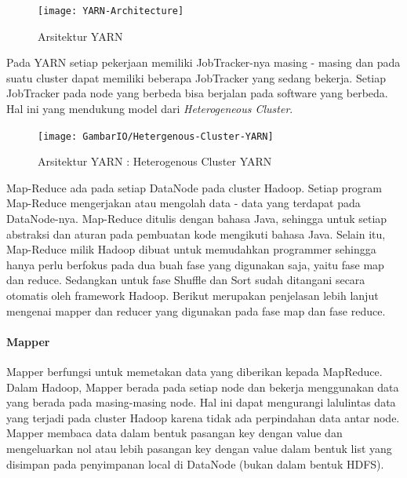 \begin{figure}[H]
\centering
\texttt{[image: YARN-Architecture]}
\caption[Arsitektur YARN]{Arsitektur YARN \footnotemark}
\label{fig:Arsitektur YARN-1}
\end{figure}
		
Pada YARN setiap pekerjaan memiliki JobTracker-nya masing - masing dan pada suatu cluster dapat memiliki beberapa JobTracker yang sedang bekerja. Setiap JobTracker pada node yang berbeda bisa berjalan pada software yang berbeda. Hal ini yang mendukung model  dari \textit{Heterogeneous Cluster}.


\begin{figure}[h]
	\centering
	\texttt{[image: GambarIO/Hetergenous-Cluster-YARN]}
	\caption[Arsitektur YARN]{Arsitektur YARN : Heterogenous Cluster YARN}
	\label{fig:Arsitektur YARN : Heterogenous Cluster YARN}
\end{figure}

Map-Reduce ada pada setiap DataNode pada cluster Hadoop. Setiap program Map-Reduce mengerjakan atau mengolah data - data yang terdapat pada DataNode-nya. Map-Reduce ditulis dengan bahasa Java, sehingga untuk setiap abstraksi dan aturan pada pembuatan kode mengikuti bahasa Java. Selain itu, Map-Reduce milik Hadoop dibuat untuk memudahkan programmer sehingga hanya perlu berfokus pada dua buah fase yang digunakan saja, yaitu fase map dan reduce. Sedangkan untuk fase Shuffle dan Sort sudah ditangani secara otomatis oleh framework Hadoop. Berikut merupakan penjelasan lebih lanjut mengenai mapper dan reducer yang digunakan pada fase map dan fase reduce.

\paragraph{Mapper} 

Mapper berfungsi untuk memetakan data yang diberikan kepada MapReduce. Dalam Hadoop, Mapper berada pada setiap node dan bekerja menggunakan data yang berada pada masing-masing node. Hal ini dapat mengurangi lalulintas data yang terjadi pada cluster Hadoop karena tidak ada perpindahan data antar node. Mapper membaca data dalam bentuk pasangan key dengan value dan mengeluarkan nol atau lebih pasangan key dengan value dalam bentuk list yang disimpan pada penyimpanan local di DataNode (bukan dalam bentuk HDFS).

